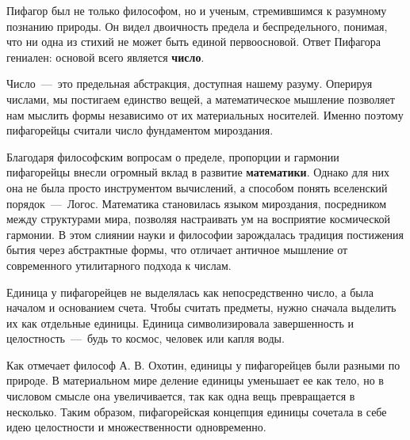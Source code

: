 Пифагор был не только философом, но и ученым, стремившимся к разумному познанию природы. Он видел двоичность предела и беспредельного, понимая, что ни одна из стихий не может быть единой первоосновой. Ответ Пифагора гениален: основой всего является \textbf{число}.

Число~---~это предельная абстракция, доступная нашему разуму. Оперируя числами, мы постигаем единство вещей, а математическое мышление позволяет нам мыслить формы независимо от их материальных носителей. Именно поэтому пифагорейцы считали число фундаментом мироздания.

Благодаря философским вопросам о пределе, пропорции и гармонии пифагорейцы внесли огромный вклад в развитие \textbf{математики}. Однако для них она не была просто инструментом вычислений, а способом понять вселенский порядок~---~Логос. Математика становилась языком мироздания, посредником между структурами мира, позволяя настраивать ум на восприятие космической гармонии. В этом слиянии науки и философии зарождалась традиция постижения бытия через абстрактные формы, что отличает античное мышление от современного утилитарного подхода к числам.


Единица у пифагорейцев не выделялась как непосредственно число, а была началом и основанием счета. Чтобы считать предметы, нужно сначала выделить их как отдельные единицы. Единица символизировала завершенность и целостность~---~будь то космос, человек или капля воды.

Как отмечает философ А. В. Охотин, единицы у пифагорейцев были разными по природе. В материальном мире деление единицы уменьшает ее как тело, но в числовом смысле она увеличивается, так как одна вещь превращается в несколько. Таким образом, пифагорейская концепция единицы сочетала в себе идею целостности и множественности одновременно.

